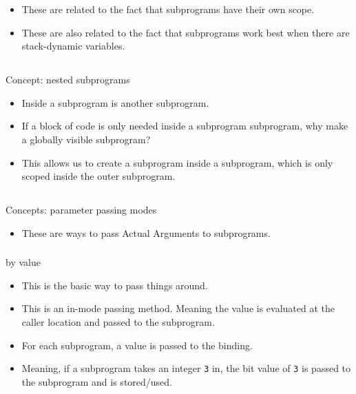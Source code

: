 \begin{itemize}[noitemsep]
\item These are related to the fact that subprograms have their own scope.
\item These are also related to the fact that subprograms work best when there are stack-dynamic variables.
\end{itemize}

\subsection{}
Concept: nested subprograms

\begin{itemize}[noitemsep]
\item Inside a subprogram is another subprogram.
\item If a block of code is only needed inside a subprogram subprogram, why make a globally visible subprogram?
\item This allows us to create a subprogram inside a subprogram, which is only scoped inside the outer subprogram.
\end{itemize}

\subsection{}
Concepts: parameter passing modes

\begin{itemize}[noitemsep]
\item These are ways to pass Actual Arguments to subprograms.
\end{itemize}

\subsubsection{}
by value

\begin{itemize}[noitemsep]
\item This is the basic way to pass things around.
\item This is an in-mode passing method. Meaning the value is evaluated at the caller location and passed to the subprogram.
\item For each subprogram, a value is passed to the binding.
\item Meaning, if a subprogram takes an integer \texttt{3} in, the bit value of \texttt{3} is passed to the subprogram and is stored/used.
\end{itemize}

